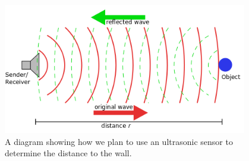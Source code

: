\begin{figure}[htp]
\centering
\includegraphics[width=0.95\textwidth, angle=0]{Meetings/February/02-08-22/02-08-22 3.PNG}
\caption{A diagram showing how we plan to use an ultrasonic sensor to determine the distance to the wall.}
\label{fig:021022_3}
\end{figure}



